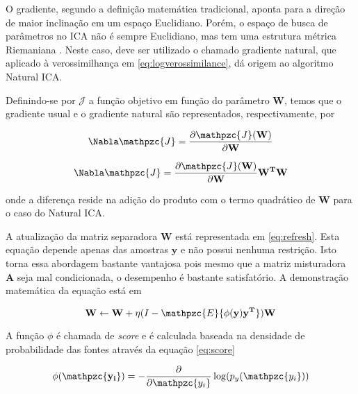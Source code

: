     O gradiente, segundo a definição matemática tradicional, aponta para a direção de maior inclinação em um espaço Euclidiano. Porém, o espaço de busca de parâmetros no ICA não é sempre Euclidiano, mas tem uma estrutura métrica Riemaniana \cite{Riemenn}. Neste caso, deve ser utilizado o chamado gradiente natural, que aplicado à verossimilhança em \ref{eq:logverossimilance}, dá origem ao algoritmo Natural ICA.
    
    Definindo-se por $\mathcal{J}$ a função objetivo em função do parâmetro $\mathbf{W}$, temos que o gradiente usual e o gradiente natural são representados, respectivamente, por
    
    \begin{equation}
        \label{eq:gradiente}
        \Nabla\mathpzc{J} = \frac{\partial \mathpzc{J}(\mathbf{W})}{\partial \mathbf{W}}
    \end{equation}
    
        \begin{equation}
        \label{eq:naturalgradiente}
        \Nabla\mathpzc{J} = \frac{\partial \mathpzc{J}(\mathbf{W})}{\partial \mathbf{W}}\mathbf{W^T}\mathbf{W}
    \end{equation}
    
    onde a diferença reside na adição do produto com o termo quadrático de $\mathbf{W}$ para o caso do Natural ICA.
    
    A atualização da matriz separadora $\mathbf{W}$ está representada em \ref{eq:refresh}. Esta equação depende apenas das amostras $\mathbf{y}$ e não possui nenhuma restrição. Isto torna essa abordagem bastante vantajosa pois mesmo que a matriz misturadora $\mathbf{A}$ seja mal condicionada, o desempenho é bastante satisfatório. A demonstração matemática da equação está em \cite{ICA3}
    
    \begin{equation}
    \label{eq:refresh}
    \mathbf{W} \leftarrow \mathbf{W} + \eta(I - \mathpzc{E}\{\phi({\mathbf{y})\mathbf{y^T}}\})\mathbf{W}
    \end{equation}
    
    A função $\phi$ é chamada de \textit{score} e é calculada baseada na densidade de probabilidade das fontes através da equação \ref{eq:score}
    
        \begin{equation}
    \label{eq:score}
    \mathbf{\phi({\mathpzc{y_i}})} = - \frac{\partial}{\partial \mathpzc{y_i}} \log(p_y(\mathpzc{y_i}))
    \end{equation}
    
